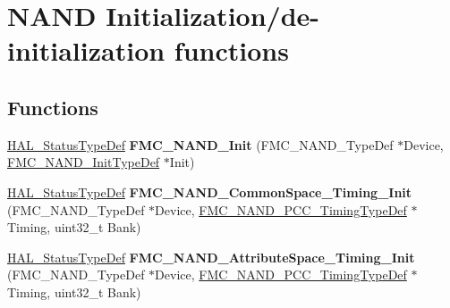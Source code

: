 \hypertarget{group___f_m_c___l_l___n_a_n_d___private___functions___group1}{}\section{N\+A\+ND Initialization/de-\/initialization functions}
\label{group___f_m_c___l_l___n_a_n_d___private___functions___group1}
\subsection*{Functions}
\begin{DoxyCompactItemize}
\item 
\hyperlink{stm32f4xx__hal__def_8h_a63c0679d1cb8b8c684fbb0632743478f}{H\+A\+L\+\_\+\+Status\+Type\+Def} {\bfseries F\+M\+C\+\_\+\+N\+A\+N\+D\+\_\+\+Init} (F\+M\+C\+\_\+\+N\+A\+N\+D\+\_\+\+Type\+Def $\ast$Device, \hyperlink{struct_f_m_c___n_a_n_d___init_type_def}{F\+M\+C\+\_\+\+N\+A\+N\+D\+\_\+\+Init\+Type\+Def} $\ast$Init)\hypertarget{group___f_m_c___l_l___n_a_n_d___private___functions___group1_ga350a12b485a4873077c17ea33e8135e6}{}\label{group___f_m_c___l_l___n_a_n_d___private___functions___group1_ga350a12b485a4873077c17ea33e8135e6}

\item 
\hyperlink{stm32f4xx__hal__def_8h_a63c0679d1cb8b8c684fbb0632743478f}{H\+A\+L\+\_\+\+Status\+Type\+Def} {\bfseries F\+M\+C\+\_\+\+N\+A\+N\+D\+\_\+\+Common\+Space\+\_\+\+Timing\+\_\+\+Init} (F\+M\+C\+\_\+\+N\+A\+N\+D\+\_\+\+Type\+Def $\ast$Device, \hyperlink{struct_f_m_c___n_a_n_d___p_c_c___timing_type_def}{F\+M\+C\+\_\+\+N\+A\+N\+D\+\_\+\+P\+C\+C\+\_\+\+Timing\+Type\+Def} $\ast$Timing, uint32\+\_\+t Bank)\hypertarget{group___f_m_c___l_l___n_a_n_d___private___functions___group1_ga1d4a635307ee611e2367ca2cba97d9d6}{}\label{group___f_m_c___l_l___n_a_n_d___private___functions___group1_ga1d4a635307ee611e2367ca2cba97d9d6}

\item 
\hyperlink{stm32f4xx__hal__def_8h_a63c0679d1cb8b8c684fbb0632743478f}{H\+A\+L\+\_\+\+Status\+Type\+Def} {\bfseries F\+M\+C\+\_\+\+N\+A\+N\+D\+\_\+\+Attribute\+Space\+\_\+\+Timing\+\_\+\+Init} (F\+M\+C\+\_\+\+N\+A\+N\+D\+\_\+\+Type\+Def $\ast$Device, \hyperlink{struct_f_m_c___n_a_n_d___p_c_c___timing_type_def}{F\+M\+C\+\_\+\+N\+A\+N\+D\+\_\+\+P\+C\+C\+\_\+\+Timing\+Type\+Def} $\ast$Timing, uint32\+\_\+t Bank)\hypertarget{group___f_m_c___l_l___n_a_n_d___private___functions___group1_ga4466e188ee95374ab26afffaae8dd496}{}\label{group___f_m_c___l_l___n_a_n_d___private___functions___group1_ga4466e188ee95374ab26afffaae8dd496}


\end{DoxyCompactItemize}
